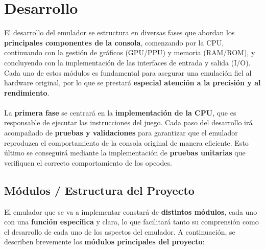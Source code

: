 \chapter{Desarrollo}
\label{develop}

El desarrollo del emulador se estructura en diversas fases que abordan los \textbf{principales componentes de la consola}, comenzando por la CPU, continuando con la gestión de gráficos (GPU/PPU) y memoria (RAM/ROM), y concluyendo con la implementación de las interfaces de entrada y salida (I/O). Cada uno de estos módulos es fundamental para asegurar una emulación fiel al hardware original, por lo que se prestará \textbf{especial atención a la precisión y al rendimiento}.
\\\\
La \textbf{primera fase} se centrará en la \textbf{implementación de la CPU}, que es responsable de ejecutar las instrucciones del juego. Cada paso del desarrollo irá acompañado de \textbf{pruebas y validaciones} para garantizar que el emulador reproduzca el comportamiento de la consola original de manera eficiente. Esto último se conseguirá mediante la implementación de \textbf{pruebas unitarias} que verifiquen el correcto comportamiento de los opcodes.

\section{Módulos / Estructura del Proyecto}

El emulador que se va a implementar constará de \textbf{distintos módulos}, cada uno con una \textbf{función específica} y clara, lo que facilitará tanto su comprensión como el desarrollo de cada uno de los aspectos del emulador. A continuación, se describen brevemente los \textbf{módulos principales del proyecto}:

